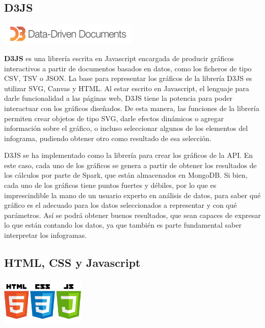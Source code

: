 \subsection{D3JS}
\begin{minipage}{\textwidth}
	\centering
	\includegraphics[width=0.5\textwidth]{imagenes/d3js_logo.png}\\[0.1cm]
\end{minipage}

\textbf{D3JS} \cite{D3JSGithub} es una librería escrita en Javascript encargada de producir gráficos interactivos a partir de documentos basados en datos, como los ficheros de tipo CSV, TSV o JSON. La base para representar los gráficos de la librería D3JS es utilizar SVG, Canvas y HTML. Al estar escrito en Javascript, el lenguaje para darle funcionalidad a las páginas web, D3JS tiene la potencia para poder interactuar con los gráficos diseñados. De esta manera, las funciones de la librería permiten crear objetos de tipo SVG, darle efectos dinámicos o agregar información sobre el gráfico, o incluso seleccionar algunos de los elementos del infograma, pudiendo obtener otro como resultado de esa selección. 

D3JS se ha implementado como la librería para crear los gráficos de la API. En este caso, cada uno de los gráficos se genera a partir de obtener los resultados de los cálculos por parte de Spark, que están almacenados en MongoDB. Si bien, cada uno de los gráficos tiene puntos fuertes y débiles, por lo que es imprescindible la mano de un usuario experto en análisis de datos, para saber qué gráfico es el adecuado para los datos seleccionados a representar y con qué parámetros. Así se podrá obtener buenos resultados, que sean capaces de expresar lo que están contando los datos, ya que también es parte fundamental saber interpretar los infogramas.

\subsection{HTML, CSS y Javascript}
\begin{minipage}{\textwidth}
	\centering
	\includegraphics[width=0.3\textwidth]{imagenes/HTML5_CSS_JavaScript_logo.png}\\[0.1cm]
\end{minipage}

